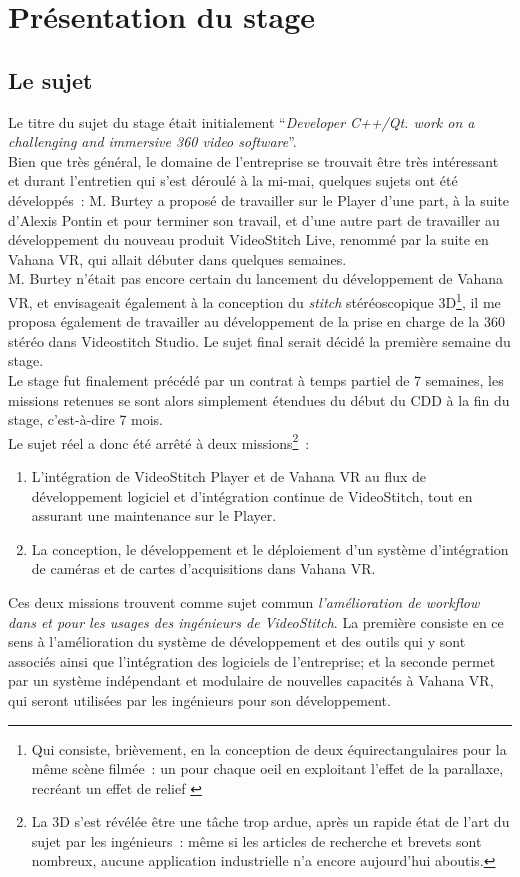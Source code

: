 \chapter{Présentation du stage}

\section{Le sujet}
\label{le-sujet}
Le titre du sujet du stage était initialement \enquote{\textit{Developer C++/Qt.
work on a challenging and immersive 360 video software}}.\\
Bien que très général, le domaine de l'entreprise se trouvait être très intéressant
et durant l'entretien qui s'est déroulé à la mi-mai, quelques sujets ont été
développés~: M. Burtey a proposé de travailler sur le Player d'une part,
à la suite d'Alexis Pontin et pour terminer son travail, et d'une autre part de
travailler au développement du nouveau produit VideoStitch Live, renommé par la
suite en Vahana VR, qui allait débuter dans quelques semaines.\\
M. Burtey n'était pas encore certain du lancement du développement de Vahana VR, 
et envisageait également à la conception du \textit{stitch} stéréoscopique 3D\footnote{Qui
consiste, brièvement, en la conception de deux équirectangulaires pour la même
scène filmée~: un pour chaque oeil en exploitant l'effet de la parallaxe, recréant 
un effet de relief\cite{videostitch-stereo}
\cite{image-stereoscopique}}, il me proposa également de travailler au développement
de la prise en charge de la 360 stéréo dans Videostitch Studio. Le sujet final serait
décidé la première semaine du stage.\\
\newline
Le stage fut finalement précédé par un contrat à temps partiel de 7 semaines, les missions retenues
se sont alors simplement étendues du début du CDD à la fin du stage, c'est-à-dire 
7 mois.\\
Le sujet réel a donc été arrêté à deux missions\footnote{La 3D s'est révélée être 
une tâche trop ardue, après un rapide état de l'art du sujet par les ingénieurs~: 
même si les articles de recherche et brevets sont nombreux, aucune application 
industrielle n'a encore aujourd'hui aboutis.}~:
\begin{enumerate}
  \item L'intégration de VideoStitch Player et de Vahana VR au flux de développement
  logiciel et d'intégration continue de VideoStitch, tout en assurant une maintenance sur le Player.
  \item La conception, le développement et le déploiement d'un système
  d'intégration de caméras et de cartes d'acquisitions dans Vahana VR.
\end{enumerate}
Ces deux missions trouvent comme sujet commun \emph{l'amélioration de \textit{workflow}
dans et pour les usages des ingénieurs de VideoStitch}. La première consiste en 
ce sens à l'amélioration du système de développement et des outils qui y sont associés ainsi que l'intégration des logiciels
de l'entreprise; et la seconde permet par un système indépendant et modulaire de
nouvelles capacités à Vahana VR, qui seront utilisées par les ingénieurs pour son développement.


